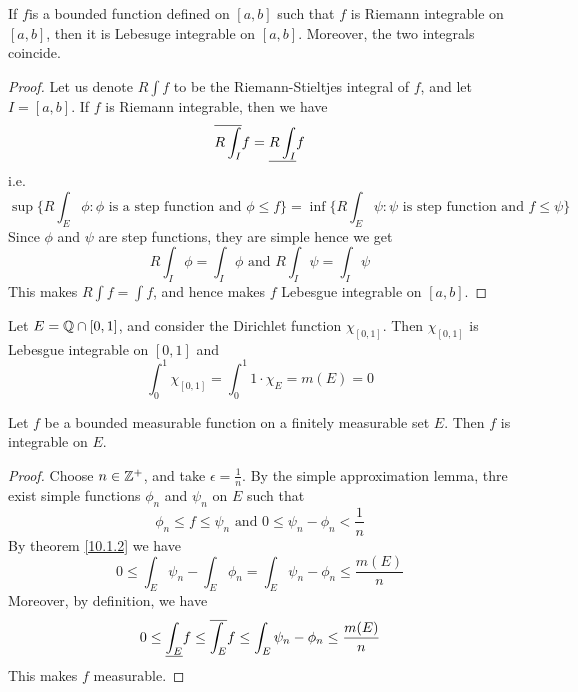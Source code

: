 \begin{theorem}\label{10.1.3}
    If $f$is a bounded function defined on  $[a,b]$ such that $f$ is Riemann
    integrable on  $[a,b]$, then it is Lebesuge integrable on $[a,b]$. Moreover,
    the two integrals coincide.
\end{theorem}
\begin{proof}
    Let us denote $R\int{f}$ to be the Riemann-Stieltjes integral of $f$, and
    let  $I=[a,b]$. If $f$ is Riemann integrable, then we have
    \begin{equation*}
        \overline{R\int_I}{f}=\underline{R\int_I}{f}
    \end{equation*}
    i.e.
    \begin{equation*}
        \sup{\{R\int_E{\phi} : \phi \text{ is a step function and } \phi \leq f\}}=
        \inf{\{R\int_E{\psi} : \psi \text{ is step function and } f \leq \psi\}}
    \end{equation*}
    Since $\phi$ and  $\psi$ are step functions, they are simple hence we get
    \begin{equation*}
        R\int_I{\phi}=\int_I{\phi} \text{ and } R\int_I{\psi}=\int_I{\psi}
    \end{equation*}
    This makes $R\int{f}=\int{f}$, and hence makes $f$ Lebesgue integrable on
    $[a,b]$.
\end{proof}

\begin{example}\label{10.1}
    Let $E=\mathbb{Q} \cap [0,1]$, and consider the Dirichlet function $\chi_{[0,1]}$.
    Then $\chi_{[0,1]}$ is Lebesgue integrable on $[0,1]$ and
    \begin{equation*}
        \int_0^1{\chi_{[0,1]}}=\int_0^1{1 \cdot \chi_E}=m(E)=0
    \end{equation*}
\end{example}

\begin{theorem}\label{10.1.4}
    Let $f$ be a bounded measurable function on a finitely measurable set  $E$.
    Then  $f$ is integrable on  $E$.
\end{theorem}
\begin{proof}
    Choose $n \in \mathbb{Z}^+$, and take  $\epsilon=\frac{1}{n}$. By the simple
    approximation lemma, thre exist simple functions $\phi_n$ and $\psi_n$ on
    $E$ such that
    \begin{equation*}
        \phi_n \leq f \leq \psi_n \text{ and } 0 \leq \psi_n-\phi_n<\frac{1}{n}
    \end{equation*}
    By theorem \ref{10.1.2} we have
    \begin{equation*}
        0 \leq \int_E{\psi_n}-\int_E{\phi_n}=\int_E{\psi_n-\phi_n} \leq
        \frac{m(E)}{n}
    \end{equation*}
    Moreover, by definition, we have
    \begin{equation*}
        0 \leq \underline{\int_E}{f} \leq \overline{\int_E}{f} \leq \int_E{\psi_n-\phi_n}
        \leq \frac{m(E)}{n}
    \end{equation*}
    This makes $f$ measurable.
\end{proof}

